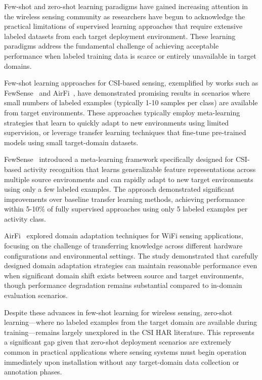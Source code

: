 \documentclass[journal]{IEEEtran}
\begin{document}
Few-shot and zero-shot learning paradigms have gained increasing attention in the wireless sensing community as researchers have begun to acknowledge the practical limitations of supervised learning approaches that require extensive labeled datasets from each target deployment environment. These learning paradigms address the fundamental challenge of achieving acceptable performance when labeled training data is scarce or entirely unavailable in target domains.

Few-shot learning approaches for CSI-based sensing, exemplified by works such as FewSense~\cite{fewsense2022} and AirFi~\cite{airfi2022}, have demonstrated promising results in scenarios where small numbers of labeled examples (typically 1-10 samples per class) are available from target environments. These approaches typically employ meta-learning strategies that learn to quickly adapt to new environments using limited supervision, or leverage transfer learning techniques that fine-tune pre-trained models using small target-domain datasets.

FewSense~\cite{fewsense2022} introduced a meta-learning framework specifically designed for CSI-based activity recognition that learns generalizable feature representations across multiple source environments and can rapidly adapt to new target environments using only a few labeled examples. The approach demonstrated significant improvements over baseline transfer learning methods, achieving performance within 5-10\% of fully supervised approaches using only 5 labeled examples per activity class.

AirFi~\cite{airfi2022} explored domain adaptation techniques for WiFi sensing applications, focusing on the challenge of transferring knowledge across different hardware configurations and environmental settings. The study demonstrated that carefully designed domain adaptation strategies can maintain reasonable performance even when significant domain shift exists between source and target environments, though performance degradation remains substantial compared to in-domain evaluation scenarios.

Despite these advances in few-shot learning for wireless sensing, zero-shot learning—where no labeled examples from the target domain are available during training—remains largely unexplored in the CSI HAR literature. This represents a significant gap given that zero-shot deployment scenarios are extremely common in practical applications where sensing systems must begin operation immediately upon installation without any target-domain data collection or annotation phases.
\end{document}

